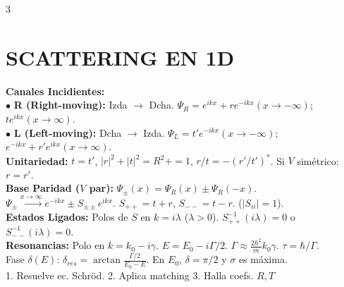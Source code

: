 \documentclass[8pt,a4paper,fleqn]{extarticle} %
\begin{document}
\begin{multicols}{3}
\section{SCATTERING EN 1D }
\textbf{Canales Incidientes:}\\
$\bullet$ \textbf{R (Right-moving):} Izda $\to$ Dcha. $\Psi_R = e^{ikx} + r e^{-ikx} (x \to -\infty)$; $t e^{ikx} (x \to \infty)$.\\
$\bullet$ \textbf{L (Left-moving):} Dcha $\to$ Izda. $\Psi_L = t' e^{-ikx} (x \to -\infty)$; $e^{-ikx} + r' e^{ikx} (x \to \infty)$.\\
\textbf{Unitariedad:} $t=t'$, $|r|^2+|t|^2=R^2+=1$, $r/t = -(r'/t')^*$. Si $V$ simétrico: $r=r'$.\\
\textbf{Base Paridad ($V$ par):} $\Psi_\pm(x) = \Psi_R(x) \pm \Psi_R(-x)$.\\
$\Psi_\pm \xrightarrow{x \to \infty} e^{-ikx} \pm S_{\pm\pm} e^{ikx}$. $S_{++} = t+r$, $S_{--} = t-r$. ($|S_{ii}|=1$).\\
\textbf{Estados Ligados:} Polos de $S$ en $k = i\lambda$ ($\lambda>0$). $S_{++}^{-1}(i\lambda)=0$ o $S_{--}^{-1}(i\lambda)=0$.\\
\textbf{Resonancias:} Polo en $k = k_0 - i\gamma$. $E = E_0 - i\Gamma/2$. $\Gamma \approx \frac{2\hbar^2}{m}k_0\gamma.$ $\tau = \hbar / \Gamma$.\\
Fase $\delta(E)$: $\delta_{res} = \arctan \frac{\Gamma/2}{E_0-E}$. En $E_0$, $\delta = \pi/2$ y $\sigma$ es máxima.\\
1. Resuelve ec. Schröd. 2. Aplica matching 3. Halla coefs. $R, T$


\end{multicols}
\end{document}
